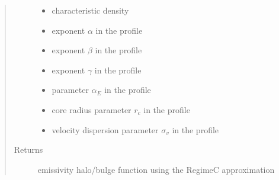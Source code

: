 \documentclass[letterpaper,10pt,english]{sphinxmanual}
\begin{document}
\begin{fulllineitems}
\begin{quote}
\begin{description}
\begin{itemize}
\item {} 
\sphinxAtStartPar
{} \textendash{} characteristic density

\item {} 
\sphinxAtStartPar
{} \textendash{} exponent \(\alpha\) in the {\hyperref[\detokenize{diffsph.profiles:diffsph.profiles.templates.hdz}]{}} profile

\item {} 
\sphinxAtStartPar
{} \textendash{} exponent \(\beta\) in the {\hyperref[\detokenize{diffsph.profiles:diffsph.profiles.templates.hdz}]{}} profile

\item {} 
\sphinxAtStartPar
{} \textendash{} exponent \(\gamma\) in the {\hyperref[\detokenize{diffsph.profiles:diffsph.profiles.templates.hdz}]{}} profile

\item {} 
\sphinxAtStartPar
{} \textendash{} parameter \(\alpha_E\) in the {\hyperref[\detokenize{diffsph.profiles:diffsph.profiles.templates.enst}]{}} profile

\item {} 
\sphinxAtStartPar
{} \textendash{} core radius parameter \(r_c\) in the {\hyperref[\detokenize{diffsph.profiles:diffsph.profiles.templates.cnfw}]{}} profile

\item {} 
\sphinxAtStartPar
{} \textendash{} velocity dispersion parameter \(\sigma_v\) in the {\hyperref[\detokenize{diffsph.profiles:diffsph.profiles.templates.sis}]{}} profile

\end{itemize}

\item[{Returns}] \leavevmode
\sphinxAtStartPar
emissivity halo/bulge function using the Regime\sphinxhyphen{}C approximation

\end{description}\end{quote}

\end{fulllineitems}
\end{document}
